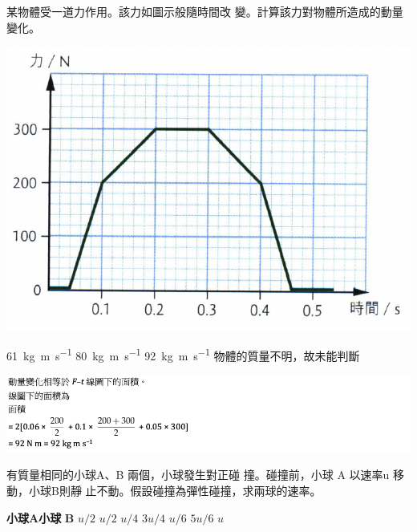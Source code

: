 {
    某物體受一道力作用。該力如圖示般隨時間改 變。計算該力對物體所造成的動量變化。
    \par{\par\centering\includegraphics[width=.4\textwidth]{./img/ch5_momentum_mc_2024-05-11-21-12-39.png}\par}
    \begin{tasks}
        \task \qty{61}{kg.m.s^{-1}}
        \task \qty{80}{kg.m.s^{-1}}
        \task \qty{92}{kg.m.s^{-1}}
        \task 物體的質量不明，故未能判斷
    \end{tasks}

}{
    \par{\par\centering\includegraphics[width=\textwidth]{./img/ch5_momentum_mc_2024-05-11-22-59-34.png}\par}
}


{
    有質量相同的小球A、B 兩個，小球發生對正碰 撞。碰撞前，小球 A 以速率u 移動，小球B則靜 止不動。假設碰撞為彈性碰撞，求兩球的速率。
    \begin{tasks}
        \task [] \textbf{小球}$\mathbf{A}$\tab\tab \textbf{小球} $\mathbf{B}$\vspace{1em}
        \task $u/2$ \tab\tab $u/2$
        \task $u/4$ \tab\tab $3u/4$
        \task $u/6$ \tab\tab $5u/6$
        \tab\tab $u$
    \end{tasks}

}{}


